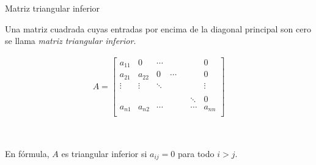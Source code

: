 \documentclass[handout]{beamer} %
\renewcommand{\_}[1]{_{\left[ #1 \right]}}
\renewcommand{\^}[1]{^{\left[ #1 \right]}}
\begin{document}
\begin{frame}{Matriz triangular inferior}
    
    Una matriz cuadrada cuyas entradas por encima de la diagonal principal son cero se llama \textit{matriz triangular inferior}.
    
    
    \begin{align*}
        A=
        \left[
        \begin{array}{ccccccc}
            a_{11} & 0 & \cdots & & &  & 0\\ 
            a_{21} & a_{22} & 0& \cdots & &  & 0\\
            \vdots & \vdots & \ddots & & &  & \vdots\\
            & &  & & &  &\\
            & &  & & & \ddots & 0  \\
            a_{n1} & a_{n2} & \cdots & & & \cdots & a_{nn}\\ 
        \end{array}
        \right]
    \end{align*}
    
    \
    
    En fórmula, $A$ es triangular inferior si $a_{ij}=0$ para todo $i>j$.
\end{frame}
\end{document}
